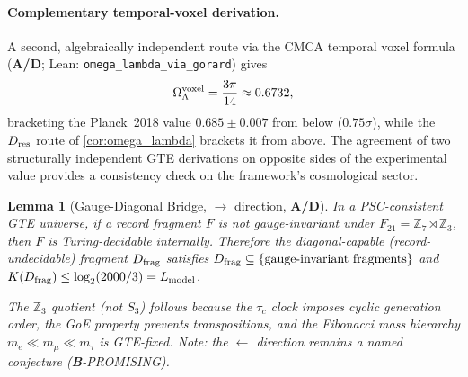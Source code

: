 \documentclass[11pt]{article}
\newtheorem{lemma}[theorem]{Lemma}
\theoremstyle{remark}
\newcommand{\CatAD}{\textbf{A/D}}
\newcommand{\CatB}{\textbf{B}}
\begin{document}
\paragraph{Complementary temporal-voxel derivation.}
A second, algebraically independent route via the CMCA temporal voxel formula (\CatAD; Lean: \texttt{omega\_lambda\_via\_gorard}) gives
\begin{equation}
\Omega_\Lambda^{\rm voxel} = \frac{3\pi}{14} \approx 0.6732,
\label{eq:omega_lambda_voxel}
\end{equation}
bracketing the Planck~2018 value $0.685 \pm 0.007$ from below ($0.75\sigma$), while the $D_{\rm res}$ route of \cref{cor:omega_lambda} brackets it from above.  The agreement of two structurally independent GTE derivations on opposite sides of the experimental value provides a consistency check on the framework's cosmological sector.

\begin{lemma}[Gauge-Diagonal Bridge, $\to$ direction, \CatAD]
\label{lem:gdb}
In a PSC-consistent GTE universe, if a record fragment $F$ is \emph{not}
gauge-invariant under $F_{21} = \mathbb{Z}_7 \rtimes \mathbb{Z}_3$, then $F$ is
Turing-decidable internally.  Therefore the diagonal-capable (record-undecidable)
fragment $D_{\rm frag}$ satisfies
$D_{\rm frag} \subseteq \{\text{gauge-invariant fragments}\}$ and
$K(D_{\rm frag}) \leq \log_2(2000/3) = L_{\rm model}$.

The $\mathbb{Z}_3$ quotient (not $S_3$) follows because the $\tau_c$ clock imposes
cyclic generation order, the GoE property prevents transpositions, and the
Fibonacci mass hierarchy $m_e \ll m_\mu \ll m_\tau$ is GTE-fixed.
\emph{Note:} the $\leftarrow$ direction remains a named conjecture (\CatB-PROMISING).
\end{lemma}
\end{document}
